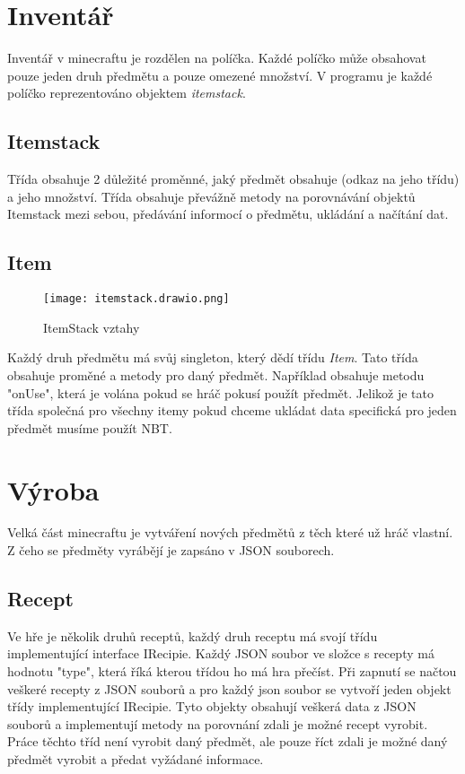 \documentclass[FM,RP]{tulthesis}
\begin{document}
\section{Inventář}
Inventář v minecraftu je rozdělen na políčka. Každé políčko může obsahovat pouze jeden druh předmětu a pouze omezené množství. V programu je každé políčko reprezentováno objektem \textit{itemstack}. 
\subsection{Itemstack}
Třída obsahuje 2 důležité proměnné, jaký předmět obsahuje (odkaz na jeho třídu) a jeho množství. Třída obsahuje převážně metody na porovnávání objektů Itemstack mezi sebou, předávání informocí o předmětu, ukládání a načítání dat.
\subsection{Item}
\begin{figure}[h]
    \centering
    \texttt{[image: itemstack.drawio.png]}
    \caption{ItemStack vztahy}
    \label{fig:enter-label}
\end{figure}
Každý druh předmětu má svůj singleton, který dědí třídu \textit{Item}. Tato třída obsahuje proměné a metody pro daný předmět. Například obsahuje metodu "onUse", která je volána pokud se hráč pokusí použít předmět. Jelikož je tato třída společná pro všechny itemy pokud chceme ukládat data specifická pro jeden předmět musíme použít NBT.
\begin{comment}
    Přidat pod item i výrobu
\end{comment}
\section{Výroba}
Velká část minecraftu je vytváření nových předmětů z těch které už hráč vlastní. Z čeho se předměty vyrábějí je zapsáno v JSON souborech. 
\subsection{Recept}
Ve hře je několik druhů receptů, každý druh receptu má svojí třídu implementující interface IRecipie. Každý JSON soubor ve složce s recepty má hodnotu "type", která říká kterou třídou ho má hra přečíst. Při zapnutí se načtou veškeré recepty z JSON souborů a pro každý json soubor se vytvoří jeden objekt třídy implementující IRecipie. Tyto objekty obsahují veškerá data z JSON souborů a implementují metody na porovnání zdali je možné recept vyrobit. Práce těchto tříd není vyrobit daný předmět, ale pouze říct zdali je možné daný předmět vyrobit a předat vyžádané informace.    
\end{document}
